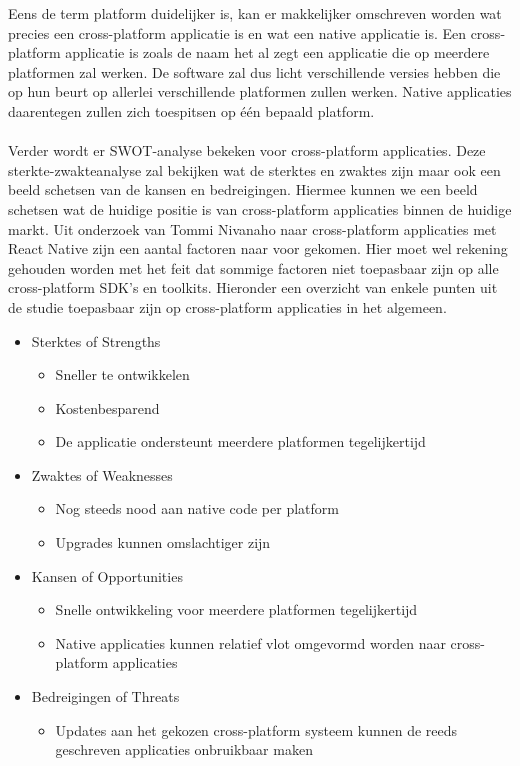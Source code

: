 Eens de term platform duidelijker is, kan er makkelijker omschreven worden wat precies een cross-platform applicatie is en wat een native applicatie is. Een cross-platform applicatie is zoals de naam het al zegt een applicatie die op meerdere platformen zal werken. De software zal dus licht verschillende versies hebben die op hun beurt op allerlei verschillende platformen zullen werken. Native applicaties daarentegen zullen zich toespitsen op één bepaald platform.
\\ \\
Verder wordt er SWOT-analyse bekeken voor cross-platform applicaties. Deze sterkte-zwakteanalyse zal bekijken wat de sterktes en zwaktes zijn maar ook een beeld schetsen van de kansen en bedreigingen. Hiermee kunnen we een beeld schetsen wat de huidige positie is van cross-platform applicaties binnen de huidige markt. Uit onderzoek van Tommi Nivanaho naar cross-platform applicaties met React Native zijn een aantal factoren naar voor gekomen.\autocite{Nivanaho2019} Hier moet wel rekening gehouden worden met het feit dat sommige factoren niet toepasbaar zijn op alle cross-platform SDK’s en toolkits. Hieronder een overzicht van enkele punten uit de studie toepasbaar zijn op cross-platform applicaties in het algemeen.
\\
\begin{itemize}
    \item Sterktes of Strengths
    \begin{itemize}
        \item Sneller te ontwikkelen
        \item Kostenbesparend
        \item De applicatie ondersteunt meerdere platformen tegelijkertijd
    \end{itemize}
    \item Zwaktes of Weaknesses
    \begin{itemize}
        \item Nog steeds nood aan native code per platform
        \item Upgrades kunnen omslachtiger zijn
    \end{itemize}
    \item Kansen of Opportunities
    \begin{itemize}
        \item Snelle ontwikkeling voor meerdere platformen tegelijkertijd
        \item Native applicaties kunnen relatief vlot omgevormd worden naar cross-platform applicaties
    \end{itemize}
    \item Bedreigingen of Threats
    \begin{itemize}
        \item Updates aan het gekozen cross-platform systeem kunnen de reeds geschreven applicaties onbruikbaar maken
    \end{itemize}
\end{itemize}

